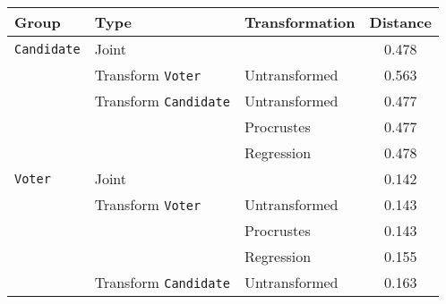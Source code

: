 \begin{tabular}{lllc}
  \toprule
Group & Type & Transformation & Distance \\ 
  \midrule
\texttt{Candidate} & Joint &  & 0.478 \\ 
   & Transform \texttt{Voter} & Untransformed & 0.563 \\ 
   & Transform \texttt{Candidate} & Untransformed & 0.477 \\ 
   &  & Procrustes & 0.477 \\ 
   &  & Regression & 0.478 \\ 
   \midrule
\texttt{Voter} & Joint &  & 0.142 \\ 
   & Transform \texttt{Voter} & Untransformed & 0.143 \\ 
   &  & Procrustes & 0.143 \\ 
   &  & Regression & 0.155 \\ 
   & Transform \texttt{Candidate} & Untransformed & 0.163 \\ 
   \bottomrule
\end{tabular}
